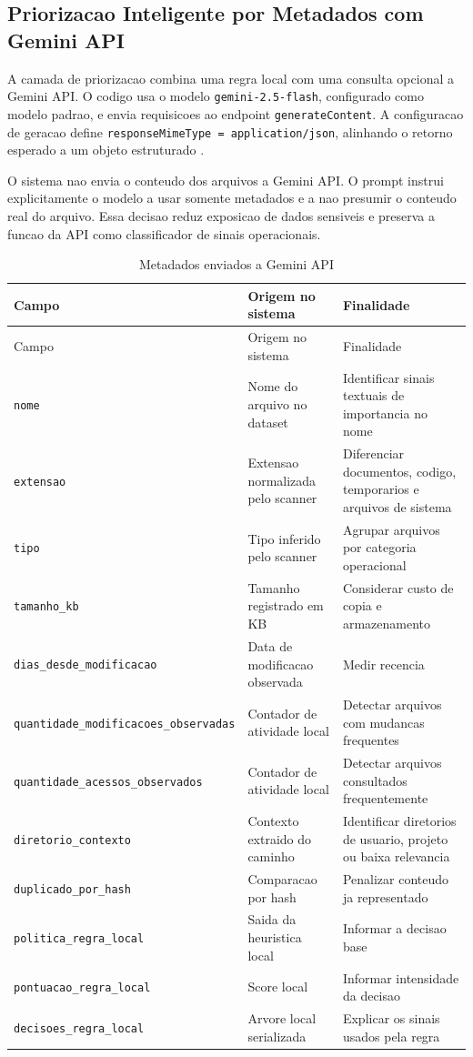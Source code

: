 \documentclass[12pt,a4paper]{article}
\begin{document}
\subsection{Priorizacao Inteligente por Metadados com Gemini API}

A camada de priorizacao combina uma regra local com uma consulta opcional a Gemini API. O codigo usa o modelo \texttt{gemini-2.5-flash}, configurado como modelo padrao, e envia requisicoes ao endpoint \texttt{generateContent}. A configuracao de geracao define \texttt{responseMimeType = application/json}, alinhando o retorno esperado a um objeto estruturado \cite{googleStructuredOutput,googleGeminiModels}.

O sistema nao envia o conteudo dos arquivos a Gemini API. O prompt instrui explicitamente o modelo a usar somente metadados e a nao presumir o conteudo real do arquivo. Essa decisao reduz exposicao de dados sensiveis e preserva a funcao da API como classificador de sinais operacionais.

\small
\begin{longtable}{L{0.27\textwidth}L{0.30\textwidth}L{0.33\textwidth}}
\caption{Metadados enviados a Gemini API}\\
\toprule
Campo & Origem no sistema & Finalidade \\
\midrule
\endfirsthead
\toprule
Campo & Origem no sistema & Finalidade \\
\midrule
\endhead
\texttt{nome} & Nome do arquivo no dataset & Identificar sinais textuais de importancia no nome \\
\texttt{extensao} & Extensao normalizada pelo scanner & Diferenciar documentos, codigo, temporarios e arquivos de sistema \\
\texttt{tipo} & Tipo inferido pelo scanner & Agrupar arquivos por categoria operacional \\
\texttt{tamanho\_kb} & Tamanho registrado em KB & Considerar custo de copia e armazenamento \\
\texttt{dias\_desde\_modificacao} & Data de modificacao observada & Medir recencia \\
\texttt{quantidade\_modificacoes\_observadas} & Contador de atividade local & Detectar arquivos com mudancas frequentes \\
\texttt{quantidade\_acessos\_observados} & Contador de atividade local & Detectar arquivos consultados frequentemente \\
\texttt{diretorio\_contexto} & Contexto extraido do caminho & Identificar diretorios de usuario, projeto ou baixa relevancia \\
\texttt{duplicado\_por\_hash} & Comparacao por hash & Penalizar conteudo ja representado \\
\texttt{politica\_regra\_local} & Saida da heuristica local & Informar a decisao base \\
\texttt{pontuacao\_regra\_local} & Score local & Informar intensidade da decisao \\
\texttt{decisoes\_regra\_local} & Arvore local serializada & Explicar os sinais usados pela regra \\
\bottomrule
\end{longtable}
\normalsize
\end{document}
